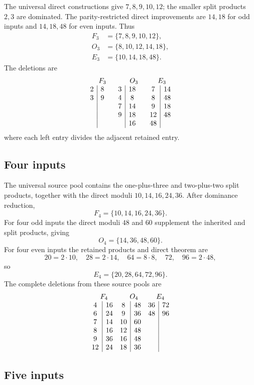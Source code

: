 The universal direct constructions give $7,8,9,10,12$; the smaller split
products $2,3$ are dominated.  The parity-restricted direct improvements are
$14,18$ for odd inputs and $14,18,48$ for even inputs.  Thus
\[
\begin{aligned}
F_3&=\{7,8,9,10,12\},\\
O_3&=\{8,10,12,14,18\},\\
E_3&=\{10,14,18,48\}.
\end{aligned}
\]
The deletions are
\[
\begin{array}{c|c@{\qquad}c|c@{\qquad}c|c}
\multicolumn{2}{c}{F_3} & \multicolumn{2}{c}{O_3} & \multicolumn{2}{c}{E_3}\\
2&8 & 3&18 & 7&14\\
3&9 & 4&8  & 8&48\\
 &&7&14 & 9&18\\
 &&9&18 & 12&48\\
 &&     & 16&48
\end{array}
\]
where each left entry divides the adjacent retained entry.

\subsection{Four inputs}

The universal source pool contains the one-plus-three and two-plus-two split
products, together with the direct moduli $10,14,16,24,36$.  After dominance
reduction,
\[
 F_4=\{10,14,16,24,36\}.
\]
For four odd inputs the direct moduli $48$ and $60$ supplement the inherited
and split products, giving
\[
 O_4=\{14,36,48,60\}.
\]
For four even inputs the retained products and direct theorem are
\[
20=2\cdot10,\quad28=2\cdot14,\quad64=8\cdot8,
\quad72,\quad96=2\cdot48,
\]
so
\[
 E_4=\{20,28,64,72,96\}.
\]
The complete deletions from these source pools are
\[
\begin{array}{c|c@{\quad}c|c@{\quad}c|c}
\multicolumn{2}{c}{F_4} & \multicolumn{2}{c}{O_4} & \multicolumn{2}{c}{E_4}\\
4&16 & 8&48 & 36&72\\
6&24 & 9&36 & 48&96\\
7&14 & 10&60 &&\\
8&16 & 12&48 &&\\
9&36 & 16&48 &&\\
12&24 & 18&36 &&
\end{array}
\]

\subsection{Five inputs}

